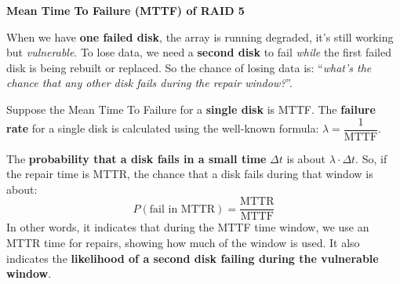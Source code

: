 \newpage

\begin{flushleft}
    \textcolor{Green3}{ \textbf{Mean Time To Failure (MTTF) of RAID 5}}
\end{flushleft}
When we have \textbf{one failed disk}, the array is running degraded, it's still working but \emph{vulnerable}. To lose data, we need a \textbf{second disk} to fail \emph{while} the first failed disk is being rebuilt or replaced. So the chance of losing data is: ``\emph{what's the chance that any other disk fails during the repair window?}''.

\highspace
Suppose the Mean Time To Failure for a \textbf{single disk} is MTTF. The \textbf{failure rate} for a single disk is calculated using the well-known formula: $\lambda = \dfrac{1}{\text{MTTF}}$.

\highspace
The \textbf{probability that a disk fails in a small time} $\Delta t$ is about $\lambda \cdot \Delta t$. So, if the repair time is MTTR, the chance that a disk fails during that window is about:
\begin{equation}\label{eq: RAID 5 - probability that a disk fails in a small time}
    P(\text{fail in MTTR}) = \dfrac{\text{MTTR}}{\text{MTTF}}
\end{equation}
In other words, it indicates that during the MTTF time window, we use an MTTR time for repairs, showing how much of the window is used. It also indicates the \textbf{likelihood of a second disk failing during the vulnerable window}.

